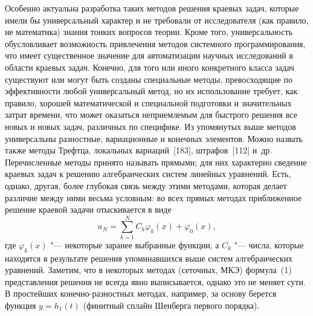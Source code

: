 Особенно актуальна разработка таких методов решения краевых задач, которые
имели бы универсальный характер и не требовали от исследователя (как
правило, не математика) знания тонких вопросов теории. Кроме того,
универсальность обусловливает возможность привлечения методов системного
программирования, что имеет существенное значение для автоматизации научных
исследований в области краевых задач. Конечно, для того или иного
конкретного класса задач существуют или могут быть созданы специальные
методы, превосходящие по эффективности любой универсальный метод, но их
использование требует, как правило, хорошей математической и специальной
подготовки и значительных затрат времени, что может оказаться неприемлемым
для быстрого решения все новых и новых задач, различных по специфике. Из
упомянутых выше методов универсальны разностные, вариационные и конечных
элементов. Можно назвать также методы Трефтца, локальных вариаций~[183],
штрафов~[112] и~др. Перечисленные методы принято называть прямыми; для них
характерно сведение краевых задач к решению алгебраических систем линейных
уравнений. Есть, однако, другая, более глубокая связь между этими методами,
которая делает различие между ними весьма условным: во всех прямых методах
приближенное решение краевой задачи отыскивается в виде
\begin{equation}\tag{1}\label{eq:intro1}
u_N=\sum_{k=1}^{N}C_k\varphi_k(x)+\varphi_0(x),
\end{equation}
где $\varphi_k(x)$ "--- некоторые заранее выбранные функции, а $C_k$ "---
числа, которые находятся в результате решения упоминавшихся выше систем
алгебраических уравнений. Заметим, что в некоторых методах (сеточных, МКЭ)
формула~(1) представления решения не всегда явно выписывается, однако это
не меняет сути. В простейших конечно-разностных методах, например, за основу
берется функция $y=h_1(t)$ (финитный сплайн Шенберга первого порядка).

